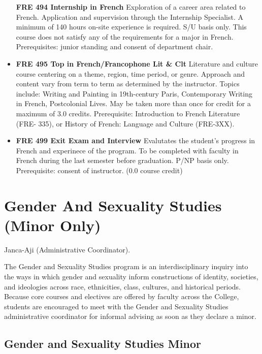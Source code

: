 \documentclass[
  letterpaper,
]{scrbook}
\begin{document}
\begin{itemize}
  \textbf{FRE 494 Internship in French} Exploration of a career area
  related to French. Application and supervision through the Internship
  Specialist. A minimum of 140 hours on-site experience is required. S/U
  basis only. This course does not satisfy any of the requirements for a
  major in French. Prerequisites: junior standing and consent of
  department chair.
\item
  \textbf{FRE 495 Top in French/Francophone Lit \& Clt} Literature and
  culture course centering on a theme, region, time period, or genre.
  Approach and content vary from term to term as determined by the
  instructor. Topics include: Writing and Painting in 19th-century
  Paris, Contemporary Writing in French, Postcolonial Lives. May be
  taken more than once for credit for a maximum of 3.0 credits.
  Prerequisite: Introduction to French Literature (FRE- 335), or History
  of French: Language and Culture (FRE-3XX).
\item
  \textbf{FRE 499 Exit Exam and Interview} Evalutates the student's
  progress in French and experinece of the program. To be completed with
  faculty in French during the last semester before graduation. P/NP
  basis only. Prerequisite: consent of instructor. (0.0 course credit)
\end{itemize}

\section{Gender And Sexuality Studies (Minor
Only)}\label{sec-gender-and-sexuality-studies}

Janca-Aji (Administrative Coordinator).

The Gender and Sexuality Studies program is an interdisciplinary inquiry
into the ways in which gender and sexuality inform constructions of
identity, societies, and ideologies across race, ethnicities, class,
cultures, and historical periods. Because core courses and electives are
offered by faculty across the College, students are encouraged to meet
with the Gender and Sexuality Studies administrative coordinator for
informal advising as soon as they declare a minor.

\subsection{Gender and Sexuality Studies
Minor}\label{gender-and-sexuality-studies-minor}
\end{document}
